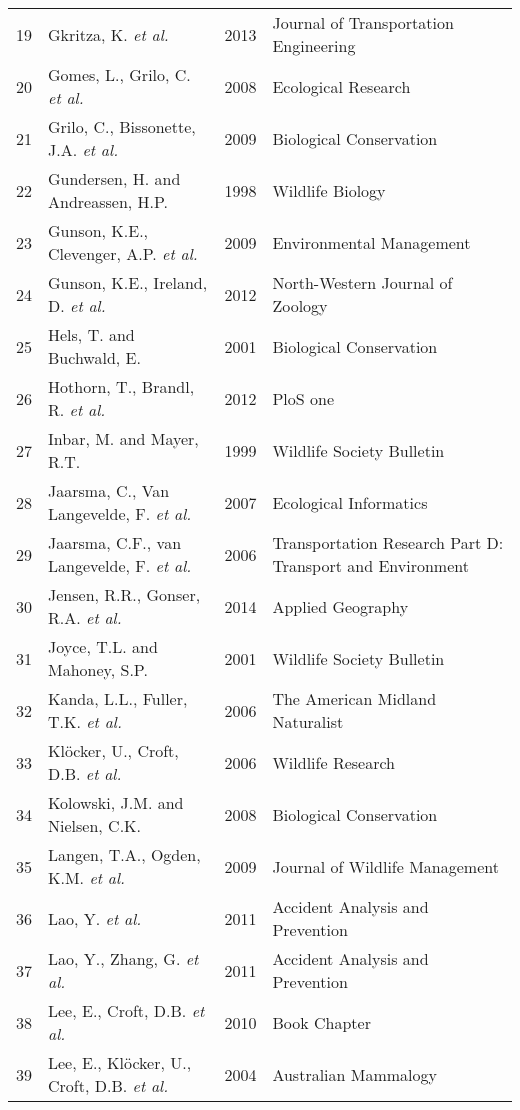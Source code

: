 \begin{longtable}[c]{p{.75cm}p{6cm}p{1.25cm}p{5.5cm}}
   19 & Gkritza, K. \textit{et al.} & 2013 & Journal of Transportation Engineering \\ 
   20 & Gomes, L., Grilo, C. \textit{et al.} & 2008 & Ecological Research \\ 
   21 & Grilo, C., Bissonette, J.A. \textit{et al.} & 2009 & Biological Conservation \\ 
   22 & Gundersen, H. and Andreassen, H.P. & 1998 & Wildlife Biology \\ 
   23 & Gunson, K.E., Clevenger, A.P. \textit{et al.} & 2009 & Environmental Management \\ 
   24 & Gunson, K.E., Ireland, D. \textit{et al.} & 2012 & North-Western Journal of Zoology \\ 
   25 & Hels, T. and Buchwald, E. & 2001 & Biological Conservation \\ 
   26 & Hothorn, T., Brandl, R. \textit{et al.} & 2012 & PloS one \\ 
   27 & Inbar, M. and Mayer, R.T. & 1999 & Wildlife Society Bulletin \\ 
   28 & Jaarsma, C., Van Langevelde, F. \textit{et al.} & 2007 & Ecological Informatics \\ 
   29 & Jaarsma, C.F., van Langevelde, F. \textit{et al.} & 2006 & Transportation Research Part D: Transport and Environment  \\ 
   30 & Jensen, R.R., Gonser, R.A. \textit{et al.} & 2014 & Applied Geography \\ 
   31 & Joyce, T.L. and Mahoney, S.P. & 2001 & Wildlife Society Bulletin \\ 
   32 & Kanda, L.L., Fuller, T.K. \textit{et al.} & 2006 & The American Midland Naturalist \\ 
   33 & Klöcker, U., Croft, D.B. \textit{et al.} & 2006 & Wildlife Research \\ 
   34 & Kolowski, J.M. and Nielsen, C.K. & 2008 & Biological Conservation  \\ 
   35 & Langen, T.A., Ogden, K.M. \textit{et al.} & 2009 & Journal of Wildlife Management \\ 
   36 & Lao, Y. \textit{et al.} & 2011 & Accident Analysis and Prevention \\ 
   37 & Lao, Y., Zhang, G. \textit{et al.} & 2011 & Accident Analysis and Prevention \\ 
   38 & Lee, E., Croft, D.B. \textit{et al.} & 2010 & Book Chapter \\ 
   39 & Lee, E., Klöcker, U., Croft, D.B. \textit{et al.} & 2004 & Australian Mammalogy \\ 

\end{longtable}
